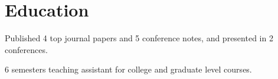 \documentclass[letterpaper]{deedy-resume-openfont}
\begin{document}



\section{Education} 

\begin{tightemize}
\item Published 4 top journal papers and 5 conference notes, and presented in 2 conferences.
\item 6 semesters teaching assistant for college and graduate level courses.
\end{tightemize}
\sectionsep


\end{document}
